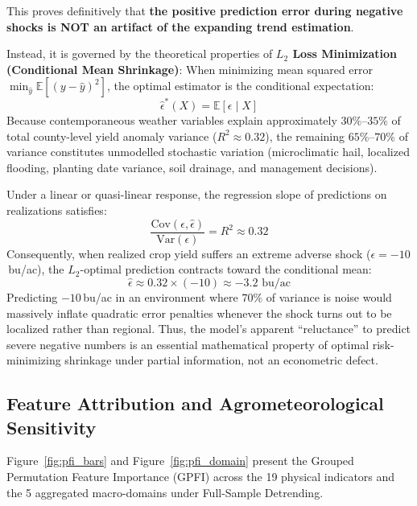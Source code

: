 \documentclass[11pt,a4paper]{article}
\begin{document}
\noindent This proves definitively that \textbf{the positive prediction error during negative shocks is NOT an artifact of the expanding trend estimation}. 

Instead, it is governed by the theoretical properties of \textbf{$L_2$ Loss Minimization (Conditional Mean Shrinkage)}:
When minimizing mean squared error $\min_{\hat{y}} \mathbb{E}[(y - \hat{y})^2]$, the optimal estimator is the conditional expectation:
\begin{equation}
    \hat{\epsilon}^*(X) = \mathbb{E}[\epsilon \mid X]
\end{equation}
Because contemporaneous weather variables explain approximately $30\%\text{--}35\%$ of total county-level yield anomaly variance ($R^2 \approx 0.32$), the remaining $65\%\text{--}70\%$ of variance constitutes unmodelled stochastic variation (microclimatic hail, localized flooding, planting date variance, soil drainage, and management decisions). 

Under a linear or quasi-linear response, the regression slope of predictions on realizations satisfies:
\begin{equation}
    \frac{\text{Cov}(\epsilon, \hat{\epsilon})}{\text{Var}(\epsilon)} = R^2 \approx 0.32
\end{equation}
Consequently, when realized crop yield suffers an extreme adverse shock ($\epsilon = -10$\,bu/ac), the $L_2$-optimal prediction contracts toward the conditional mean:
\begin{equation}
    \hat{\epsilon} \approx 0.32 \times (-10) \approx -3.2\text{ bu/ac}
\end{equation}
Predicting $-10$\,bu/ac in an environment where $70\%$ of variance is noise would massively inflate quadratic error penalties whenever the shock turns out to be localized rather than regional. Thus, the model's apparent ``reluctance'' to predict severe negative numbers is an essential mathematical property of optimal risk-minimizing shrinkage under partial information, not an econometric defect.

\subsection{Feature Attribution and Agrometeorological Sensitivity}

Figure~\ref{fig:pfi_bars} and Figure~\ref{fig:pfi_domain} present the Grouped Permutation Feature Importance (GPFI) across the 19 physical indicators and the 5 aggregated macro-domains under Full-Sample Detrending.
\end{document}
